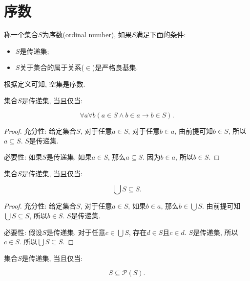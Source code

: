 \chapter{序数}
\begin{definition}
	称一个集合$S$为序数(ordinal number), 如果$S$满足下面的条件:
	\begin{itemize}[itemindent=1em]
		\item $S$是传递集;
		\item $S$关于集合的属于关系($\in$)是严格良基集.
	\end{itemize}
\end{definition}

根据定义可知, 空集是序数.

\begin{proposition}
	集合$S$是传递集, 当且仅当:
	
	\begin{equation}
		\forall a\forall b(a\in S\wedge b\in a\rightarrow b\in S).
	\end{equation}
\end{proposition}

\begin{proof}
	充分性: 给定集合$S$, 对于任意$a\in S$, 对于任意$b\in a$, 由前提可知$b\in S$, 所以$a\subseteq S$. $S$是传递集.
	
	必要性: 如果$S$是传递集. 如果$a\in S$, 那么$a\subseteq S$. 因为$b\in a$, 所以$b\in S$.
\end{proof}

\begin{proposition}
	集合$S$是传递集, 当且仅当:
	
	\begin{equation}
		\bigcup S\subseteq S.
	\end{equation}
\end{proposition}

\begin{proof}
	充分性: 给定集合$S$, 对于任意$a\in S$, 如果$b\in a$, 那么$b\in \bigcup S$. 由前提可知$\bigcup S\subseteq S$, 所以$b\in S$. $S$是传递集.
	
	必要性: 假设$S$是传递集. 对于任意$c\in \bigcup S$, 存在$d\in S$且$c\in d$. $S$是传递集, 所以$c\in S$. 所以$\bigcup S\subseteq S$.
\end{proof}

\begin{proposition}
	集合$S$是传递集, 当且仅当:
	
	\begin{equation}
		S\subseteq \mathscr P(S).
	\end{equation}
\end{proposition}

